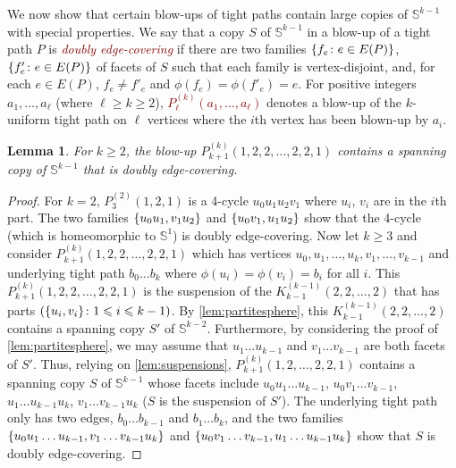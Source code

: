 \documentclass[12pt,reqno]{amsart}
\theoremstyle{plain}
\newtheorem{lemma}[theorem]{Lemma}
\theoremstyle{definition}
\numberwithin{equation}{section}
\DeclarePairedDelimiter{\set}{\{}{\}}
\renewcommand{\geq}{\geqslant}
\renewcommand{\leq}{\leqslant}
\newcommand{\defn}[1]{\textcolor{Maroon}{\emph{#1}}}
\newcommand{\bS}{\mathbb{S}}
\begin{document}
	We now show that certain blow-ups of tight paths contain large copies of $\bS^{k - 1}$ with special properties. We say that a copy $S$ of $\bS^{k - 1}$ in a blow-up of a tight path $P$ is \defn{doubly edge-covering} if there are two families $\set{f_e \colon e \in E(P)}$, $\set{f'_e \colon e \in E(P)}$ of facets of $S$ such that each family is vertex-disjoint, and, for each $e \in E(P)$, $f_e \neq f'_e$ and $\phi(f_e) = \phi(f'_e) = e$. For positive integers $a_1, \dotsc, a_\ell$ (where $\ell \geq k \geq 2$), \defn{$P_\ell^{(k)}(a_1, \dotsc, a_\ell)$} denotes a blow-up of the $k$-uniform tight path on $\ell$ vertices where the $i$th vertex has been blown-up by $a_i$.
	
	\begin{lemma}\label{lem:thin-path}
		For $k\geq 2$, the blow-up $P_{k + 1}^{(k)}(1, 2, 2, \dotsc, 2, 2, 1)$ contains a spanning copy of $\bS^{k - 1}$ that is doubly edge-covering.
	\end{lemma}
	\begin{proof}
		For $k = 2$, $P_{3}^{(2)}(1, 2, 1)$ is a 4-cycle $u_0 u_1 u_2 v_1$ where $u_i$, $v_i$ are in the $i$th part. The two families $\set{u_0 u_1, v_1 u_2}$ and $\set{u_0 v_1, u_1 u_2}$ show that the 4-cycle (which is homeomorphic to $\bS^1$) is doubly edge-covering. Now let $k \geq 3$ and consider $P_{k + 1}^{(k)}(1, 2, 2, \dotsc, 2, 2, 1)$ which has vertices $u_0, u_1, \dotsc, u_k, v_1, \dotsc, v_{k - 1}$ and underlying tight path $b_0 \dotsc b_k$ where $\phi(u_i) = \phi(v_i) = b_i$ for all $i$. This $P_{k + 1}^{(k)}(1, 2, 2, \dotsc, 2, 2, 1)$ is the suspension of the $K_{k - 1}^{(k - 1)}(2, 2, \dotsc, 2)$ that has parts $(\set{u_i, v_i} \colon 1 \leq i \leq k - 1)$. By \cref{lem:partitesphere}, this $K_{k - 1}^{(k - 1)}(2, 2, \dotsc, 2)$ contains a spanning copy $S'$ of $\bS^{k - 2}$. Furthermore, by considering the proof of \cref{lem:partitesphere}, we may assume that $u_1 \dotsc u_{k - 1}$ and $v_1 \dotsc v_{k - 1}$ are both facets of $S'$. Thus, relying on \cref{lem:suspensions}, $P_{k + 1}^{(k)}(1, 2, \dotsc, 2, 2, 1)$ contains a spanning copy $S$ of $\bS^{k - 1}$ whose facets include $u_0 u_1 \dotsc u_{k - 1}$, $u_0 v_1 \dotsc v_{k - 1}$, $u_1 \dotsc u_{k - 1} u_k$, $v_1 \dotsc v_{k - 1} u_k$ ($S$ is the suspension of $S'$). The underlying tight path only has two edges, $b_0 \dotsc b_{k - 1}$ and $b_1 \dotsc b_k$, and the two families $\set{u_0 u_1 \dotsc u_{k - 1}, v_1 \dotsc v_{k - 1} u_k}$ and $\set{u_0 v_1 \dotsc v_{k - 1}, u_1 \dotsc u_{k - 1} u_k}$ show that $S$ is doubly edge-covering.
	\end{proof}
	
\end{document}
